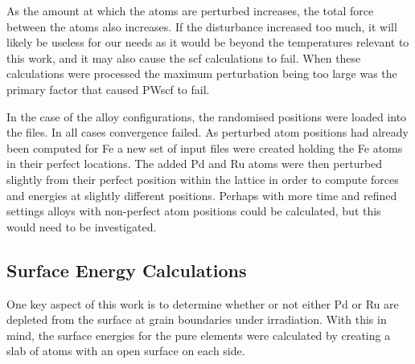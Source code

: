 As the amount at which the atoms are perturbed increases, the total force between the atoms also increases.  If the disturbance increased too much, it will likely be useless for our needs as it would be beyond the temperatures relevant to this work, and it may also cause the \acrshort{scf} calculations to fail.  When these calculations were processed the maximum perturbation being too large was the primary factor that caused PWscf to fail.

In the case of the alloy configurations, the randomised positions were loaded into the files.  In all cases convergence failed.  As perturbed atom positions had already been computed for \acrshort{Fe} a new set of input files were created holding the Fe atoms in their perfect locations.  The added \acrshort{Pd} and \acrshort{Ru} atoms were then perturbed slightly from their perfect position within the lattice in order to compute forces and energies at slightly different positions.  Perhaps with more time and refined settings alloys with non-perfect atom positions could be calculated, but this would need to be investigated.


\FloatBarrier
\subsection{Surface Energy Calculations}

One key aspect of this work is to determine whether or not either Pd or Ru are depleted from the surface at grain boundaries under irradiation.  With this in mind, the surface energies for the pure elements were calculated by creating a slab of atoms with an open surface on each side.

